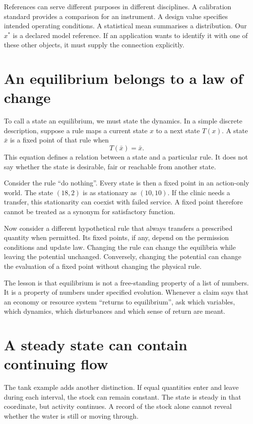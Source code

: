 References can serve different purposes in different disciplines. A calibration standard provides a comparison for an instrument. A design value specifies intended operating conditions. A statistical mean summarises a distribution. Our $x^*$ is a declared model reference. If an application wants to identify it with one of these other objects, it must supply the connection explicitly.

\section{An equilibrium belongs to a law of change}
To call a state an equilibrium, we must state the dynamics. In a simple discrete description, suppose a rule maps a current state $x$ to a next state $T(x)$. A state $\bar x$ is a fixed point of that rule when
\begin{equation}
T(\bar x)=\bar x.
\end{equation}
This equation defines a relation between a state and a particular rule. It does not say whether the state is desirable, fair or reachable from another state.

Consider the rule ``do nothing''. Every state is then a fixed point in an action-only world. The state $(18,2)$ is as stationary as $(10,10)$. If the clinic needs a transfer, this stationarity can coexist with failed service. A fixed point therefore cannot be treated as a synonym for satisfactory function.

Now consider a different hypothetical rule that always transfers a prescribed quantity when permitted. Its fixed points, if any, depend on the permission conditions and update law. Changing the rule can change the equilibria while leaving the potential unchanged. Conversely, changing the potential can change the evaluation of a fixed point without changing the physical rule.

The lesson is that equilibrium is not a free-standing property of a list of numbers. It is a property of numbers under specified evolution. Whenever a claim says that an economy or resource system ``returns to equilibrium'', ask which variables, which dynamics, which disturbances and which sense of return are meant.

\section{A steady state can contain continuing flow}
The tank example adds another distinction. If equal quantities enter and leave during each interval, the stock can remain constant. The state is steady in that coordinate, but activity continues. A record of the stock alone cannot reveal whether the water is still or moving through.

